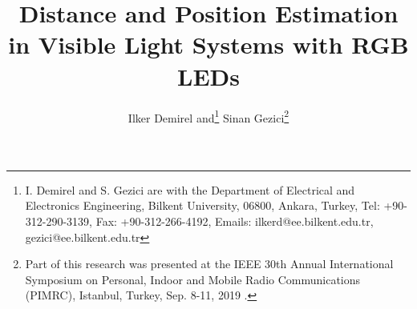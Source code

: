 \documentclass[10pt,twocolumn]{IEEEtran}
\begin{document}
%
\title{Distance and Position Estimation in Visible Light Systems with RGB LEDs}

\author{Ilker Demirel and\thanks{I. Demirel and S. Gezici are with the Department of Electrical and Electronics Engineering, Bilkent University, 06800, Ankara, Turkey, Tel: +90-312-290-3139, Fax: +90-312-266-4192, Emails: ilkerd@ee.bilkent.edu.tr, gezici@ee.bilkent.edu.tr} Sinan Gezici\thanks{Part of this research was presented at the IEEE 30th Annual International Symposium on Personal, Indoor and Mobile Radio Communications (PIMRC), Istanbul, Turkey, Sep. 8-11, 2019 \cite{IlkerPIMRC}.}}


\end{document}
